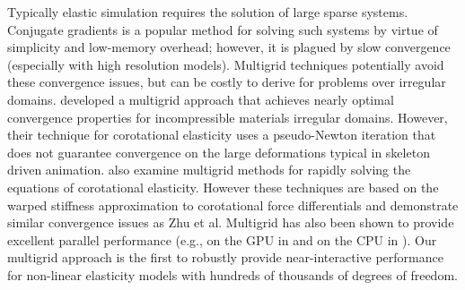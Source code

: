 Typically elastic simulation requires the solution of large sparse systems. Conjugate gradients is a popular method for solving such systems by virtue of simplicity and low-memory overhead;
however, it is plagued by slow convergence (especially with high resolution models). Multigrid techniques potentially avoid these convergence issues, but can be costly to derive for problems
over irregular domains. \cite{Zhu:2010:EMM} developed a multigrid approach that achieves nearly optimal convergence properties for incompressible materials  irregular
domains. However, their technique for corotational elasticity uses a pseudo-Newton iteration that does not guarantee convergence on the large deformations typical in skeleton driven
animation. \cite{Dick:2011:CUDAFEM,Georgii06,Wu04} also examine multigrid methods for rapidly solving the equations of corotational elasticity. However these techniques are based on the warped
stiffness approximation to corotational force differentials and demonstrate similar convergence issues as Zhu et al. Multigrid has also been shown to provide excellent parallel performance
(e.g., on the GPU in \cite{Dick:2011:CUDAFEM} and on the CPU in \cite{Zhu:2010:EMM}). \cite{Otaduy:2007:adaptivedeform}  Our multigrid approach is the first to robustly provide near-interactive performance for non-linear elasticity models with hundreds of thousands of degrees of freedom.
